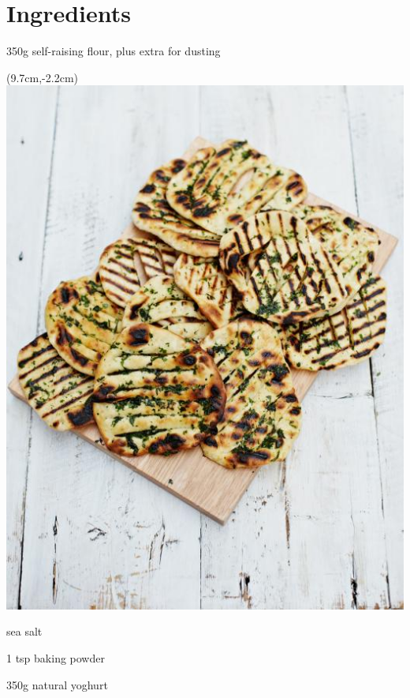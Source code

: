 \section*{Ingredients}
\begin{ingredients-list}
	\item 350g self-raising flour, plus extra for dusting
		\begin{textblock*}{8cm}(9.7cm,-2.2cm) %
			\includegraphics[scale=0.24]{./img/flatbread.jpg}
		\end{textblock*}
	\item sea salt
	\item 1 tsp baking powder
	\item 350g natural yoghurt
\end{ingredients-list}

